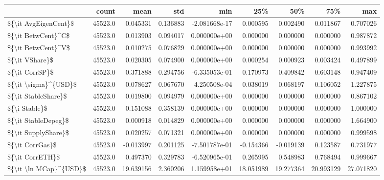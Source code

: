 \begin{tabular}{lrrrrrrrr}
\toprule
{} &    count &       mean &       std &           min &        25\% &        50\% &        75\% &        max \\
\midrule
\$\{\textbackslash it AvgEigenCent\}\$   &  45523.0 &   0.045331 &  0.136883 & -2.081668e-17 &   0.000595 &   0.002490 &   0.011867 &   0.707026 \\
\$\{\textbackslash it BetwCent\}\textasciicircum C\$     &  45523.0 &   0.013903 &  0.094017 &  0.000000e+00 &   0.000000 &   0.000000 &   0.000000 &   0.987872 \\
\$\{\textbackslash it BetwCent\}\textasciicircum V\$     &  45523.0 &   0.010275 &  0.076829 &  0.000000e+00 &   0.000000 &   0.000000 &   0.000000 &   0.993992 \\
\$\{\textbackslash it VShare\}\$         &  45523.0 &   0.020305 &  0.074900 &  0.000000e+00 &   0.000254 &   0.000923 &   0.003424 &   0.497899 \\
\$\{\textbackslash it CorrSP\}\$         &  45523.0 &   0.371888 &  0.294756 & -6.335053e-01 &   0.170973 &   0.409842 &   0.603148 &   0.947409 \\
\$\{\textbackslash it \textbackslash sigma\}\textasciicircum \{USD\}\$   &  45523.0 &   0.078627 &  0.067670 &  4.250508e-04 &   0.038019 &   0.068197 &   0.106052 &   1.227875 \\
\$\{\textbackslash it StableShare\}\$    &  45523.0 &   0.019800 &  0.094979 &  0.000000e+00 &   0.000000 &   0.000000 &   0.000000 &   0.867102 \\
\$\{\textbackslash i Stable\}\$          &  45523.0 &   0.151088 &  0.358139 &  0.000000e+00 &   0.000000 &   0.000000 &   0.000000 &   1.000000 \\
\$\{\textbackslash it StableDepeg\}\$    &  45523.0 &   0.000918 &  0.014829 &  0.000000e+00 &   0.000000 &   0.000000 &   0.000000 &   1.664900 \\
\$\{\textbackslash it SupplyShare\}\$    &  45523.0 &   0.020257 &  0.071321 &  0.000000e+00 &   0.000000 &   0.000000 &   0.000000 &   0.999598 \\
\$\{\textbackslash it CorrGas\}\$        &  45523.0 &  -0.013997 &  0.201125 & -7.501787e-01 &  -0.154366 &  -0.019139 &   0.123587 &   0.731977 \\
\$\{\textbackslash it CorrETH\}\$        &  45523.0 &   0.497370 &  0.329783 & -6.520965e-01 &   0.265995 &   0.548983 &   0.768494 &   0.999667 \\
\$\{\textbackslash it \textbackslash ln MCap\}\textasciicircum \{USD\}\$ &  45523.0 &  19.639156 &  2.360206 &  1.159958e+01 &  18.051989 &  19.277364 &  20.993129 &  27.071820 \\
\bottomrule
\end{tabular}
